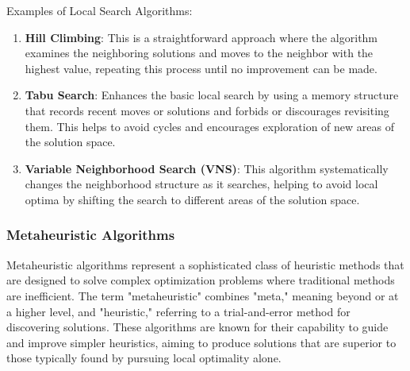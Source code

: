 \documentclass{article}
\begin{document}
    Examples of Local Search Algorithms:
    \begin{enumerate}
        \item \textbf{Hill Climbing}: This is a straightforward approach where the algorithm examines the neighboring solutions and moves to the neighbor with the highest value, repeating this process until no improvement can be made. \cite[pp. 90--94]{toth2014vehicle}
        \item \textbf{Tabu Search}: Enhances the basic local search by using a memory structure that records recent moves or solutions and forbids or discourages revisiting them. This helps to avoid cycles and encourages exploration of new areas of the solution space. \cite[pp. 90--94]{toth2014vehicle}
        \item \textbf{Variable Neighborhood Search (VNS)}: This algorithm systematically changes the neighborhood structure as it searches, helping to avoid local optima by shifting the search to different areas of the solution space. \cite[pp. 90--94]{toth2014vehicle}
    \end{enumerate}

    \subsubsection{Metaheuristic Algorithms}\label{itm:metaheuristic-algorithms}

    Metaheuristic algorithms represent a sophisticated class of heuristic methods that are designed to solve complex optimization problems where traditional methods are inefficient. The term "metaheuristic" combines "meta," meaning beyond or at a higher level, and "heuristic," referring to a trial-and-error method for discovering solutions. These algorithms are known for their capability to guide and improve simpler heuristics, aiming to produce solutions that are superior to those typically found by pursuing local optimality alone. \cite{kaveh2021}
\end{document}
